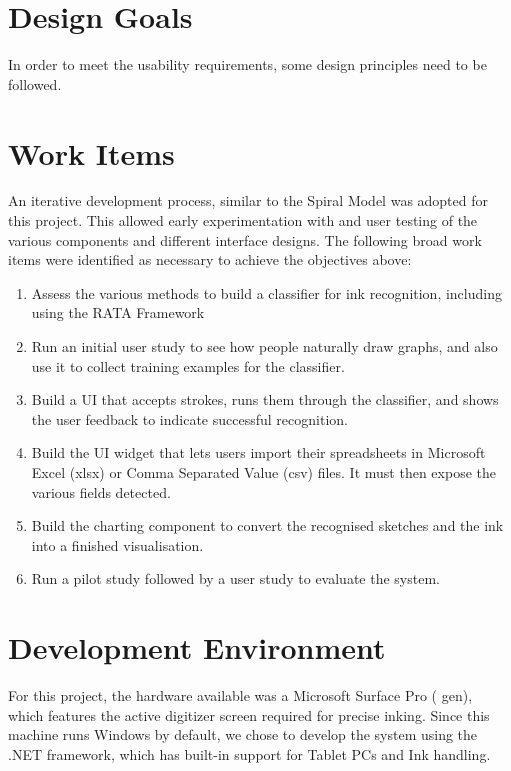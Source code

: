 	\section{Design Goals}
	In order to meet the usability requirements, some design principles need to be followed. 
	
	
	
	\section{Work Items}
	An iterative development process, similar to the Spiral Model was adopted for this project. This allowed early experimentation with and user testing of the various components and different interface designs. The following broad work items were identified as necessary to achieve the objectives above:
	\begin{enumerate}
		\item Assess the various methods to build a classifier for ink recognition, including using the RATA Framework
		\item Run an initial user study to  see how people naturally draw graphs, and also use it to collect training examples for the classifier.
		\item Build a UI that accepts strokes, runs them through the classifier, and shows the user feedback to indicate successful recognition.
		\item Build the UI widget that lets users import their spreadsheets in Microsoft Excel (xlsx) or Comma Separated Value (csv) files. It must then expose the various fields detected.
		\item Build the charting component to convert the recognised sketches and the ink into a finished visualisation.
		\item Run a pilot study followed by a user study to evaluate the system.
	\end{enumerate}
	
	
	\section{Development Environment}
	For this project, the hardware available was a Microsoft Surface Pro ( gen), which features the active digitizer screen required for precise inking. Since this machine runs Windows by default, we chose to develop the system using the .NET framework, which has built-in support for Tablet PCs and Ink handling.
	
